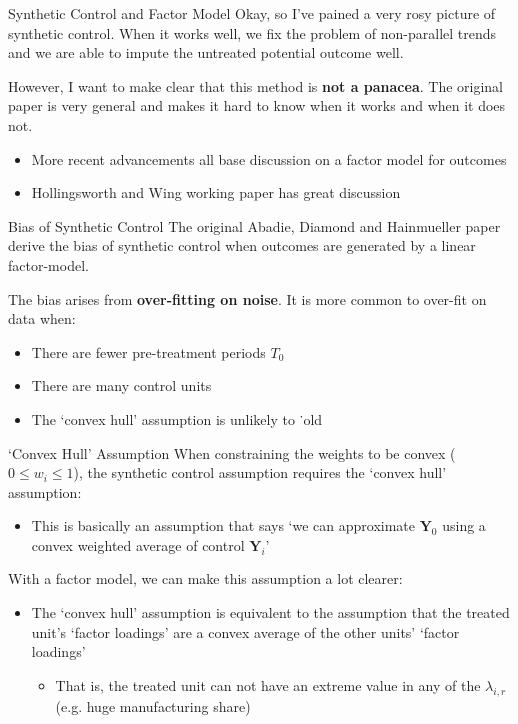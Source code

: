 \documentclass[t]{beamer}
\begin{document}
\begin{frame}{Synthetic Control and Factor Model}
  Okay, so I've pained a very rosy picture of synthetic control. When it works well, we fix the problem of non-parallel trends and we are able to impute the untreated potential outcome well. 
  
  \bigskip
  However, I want to make clear that this method is \textbf{not a panacea}. The original paper is very general and makes it hard to know when it works and when it does not. 
  \begin{itemize}
    \item More recent advancements all base discussion on a factor model for outcomes
    \item Hollingsworth and Wing working paper has great discussion
  \end{itemize} 
\end{frame}

\begin{frame}{Bias of Synthetic Control}
  The original Abadie, Diamond and Hainmueller paper derive the bias of synthetic control when outcomes are generated by a linear factor-model. 
  
  \bigskip
  The bias arises from \textbf{over-fitting on noise}. It is more common to over-fit on data when: 
  \begin{itemize}
    \item There are fewer pre-treatment periods $T_0$
    
    \item There are many control units
    
    \item The `convex hull' assumption is unlikely to ˙old
  \end{itemize}
\end{frame}

\begin{frame}{`Convex Hull' Assumption}
  When constraining the weights to be convex ($0 \leq w_i \leq 1$), the synthetic control assumption requires the `convex hull' assumption:
  \begin{itemize}
    \item This is basically an assumption that says `we can approximate $\bm{Y}_{0}$ using a convex weighted average of control $\bm{Y}_i$'
  \end{itemize}

  \pause
  \bigskip
  With a factor model, we can make this assumption a lot clearer:
  \begin{itemize}
    \item The `convex hull' assumption is equivalent to the assumption that the treated unit's `factor loadings' are a convex average of the other units' `factor loadings'
    \begin{itemize}
      \item That is, the treated unit can not have an extreme value in any of the $\lambda_{i,r}$ (e.g. huge manufacturing share)
    \end{itemize}
  \end{itemize}
\end{frame}
\end{document}
